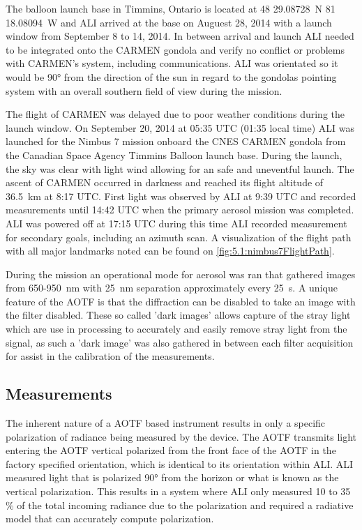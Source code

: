 \documentclass[12pt]{article}
\begin{document}
The balloon launch base in Timmins, Ontario is located at 48 29.08728~N 81 18.08094~W and ALI arrived at the base on Auguest 28, 2014 with a launch window from September 8 to 14, 2014. In between arrival and launch ALI needed to be integrated onto the CARMEN gondola and verify no conflict or problems with CARMEN's system, including communications. ALI was orientated so it would be 90\si{\degree} from the direction of the sun in regard to the gondolas pointing system with an overall southern field of view during the mission.

The flight of CARMEN was delayed due to poor weather conditions during the launch window. On September 20, 2014 at 05:35 UTC (01:35 local time) ALI was launched for the Nimbus 7 mission onboard the CNES CARMEN gondola from the Canadian Space Agency Timmins Balloon launch base. During the launch, the sky was clear with light wind allowing for an safe and uneventful launch. The ascent of CARMEN occurred in darkness and reached its flight altitude of 36.5~km at 8:17 UTC. First light was observed by ALI at 9:39 UTC and recorded measurements until 14:42 UTC when the primary aerosol mission was completed. ALI was powered off at 17:15 UTC during this time  ALI recorded measurement for secondary goals, including an azimuth scan. A visualization of the flight path with all major landmarks noted can be found on \autoref{fig:5.1:nimbus7FlightPath}.

During the mission an operational mode for aerosol was ran that gathered images from 650-950~nm with 25~nm separation approximately every 25~s. A unique feature of the AOTF is that the diffraction can be disabled to take an image with the filter disabled. These so called 'dark images' allows capture of the stray light which are use in processing to accurately and easily remove stray light from the signal, as such a 'dark image' was also gathered in between each filter acquisition for assist in the calibration of the measurements.

\subsection{Measurements}

The inherent nature of a AOTF based instrument results in only a specific polarization of radiance being measured by the device. The AOTF transmits light entering the AOTF vertical polarized from the front face of the AOTF in the factory specified orientation, which is identical to its orientation within ALI. ALI measured light that is polarized 90\si{\degree} from the horizon or what is known as the vertical polarization. This results in a system where ALI only measured 10 to 35 \% of the total incoming radiance due to the polarization and required a radiative model that can accurately compute polarization.
\end{document}
